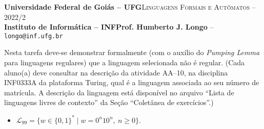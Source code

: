 \documentclass[12pt]{article}
\def\discente{Fulana(o) de tal}
\def\matricula{20010101}
\def\ua{10}
\def\myling{{99}} %
\begin{document}
 \begin{tcolorbox}[rounded corners, colback=blue!3, colframe=blue!40!black]
  \footnotesize\textbf{Universidade Federal de Goiás -- UFG}\hfill \textsc{Linguagens Formais e Autômatos -- 2022/2}\\
  \footnotesize\textbf{Instituto de Informática -- INF\hfill Prof. Humberto J. Longo} -- \scriptsize\texttt{longo@inf.ufg.br}
 \end{tcolorbox}\bigskip
%
\begin{tcolorbox}[rounded corners, colback=blue!2, colframe=blue!40!black, title=\textbf{Atividade AA-\ua}]
  Nesta tarefa deve-se demonstrar formalmente (com o auxílio do \emph{Pumping Lemma} para linguagens regulares) que a linguagem selecionada não é regular. (Cada aluno(a) deve consultar na descrição da atividade AA--\ua, na disciplina INF0333A da plataforma Turing, qual é a linguagem associada ao seu número de matrícula. A descrição da linguagem está disponível no arquivo ``Lista de linguagens livres de contexto'' da Seção ``Coletânea de exercícios''.)
\end{tcolorbox}\bigskip
%
\begin{tcolorbox}[rounded corners, colback=yellow!5, colframe=red!40!black, title={\discente\ (\matricula)}]
 \begin{itemize}[leftmargin=*]
  \item $\mathcal{L}_\myling = \{w\in\{0,1\}^*\mid w = 0^n10^n,\ n \geqslant 0\}$.
 \end{itemize}
\end{tcolorbox}\bigskip
\end{document}
